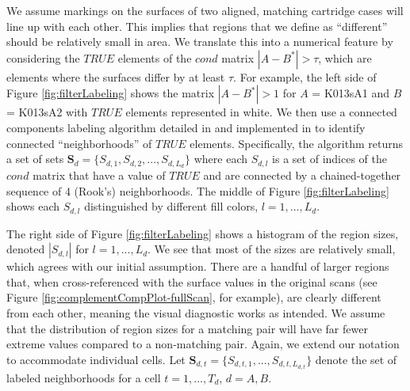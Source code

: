 \documentclass[11pt,]{isuthesis}
\begin{document}
We assume markings on the surfaces of two aligned, matching cartridge cases will line up with each other.
This implies that regions that we define as ``different'' should be relatively small in area.
We translate this into a numerical feature by considering the \(TRUE\) elements of the \(cond\) matrix \(|A - B^*| > \tau\), which are elements where the surfaces differ by at least \(\tau\).
For example, the left side of Figure \ref{fig:filterLabeling} shows the matrix \(|A - B^*| > 1\) for \(A\) = K013sA1 and \(B\) = K013sA2 with \(TRUE\) elements represented in white.
We then use a connected components labeling algorithm detailed in \citet{hesselink_concurrent_2001} and implemented in \citet{imager} to identify connected ``neighborhoods'' of \(TRUE\) elements.
Specifically, the algorithm returns a set of sets \(\pmb{S}_d = \{S_{d,1},S_{d,2},...,S_{d,L_d}\}\) where each \(S_{d,l}\) is a set of indices of the \(cond\) matrix that have a value of \(TRUE\) and are connected by a chained-together sequence of 4 (Rook's) neighborhoods.
The middle of Figure \ref{fig:filterLabeling} shows each \(S_{d,l}\) distinguished by different fill colors, \(l = 1,...,L_d\).

The right side of Figure \ref{fig:filterLabeling} shows a histogram of the region sizes, denoted \(|S_{d,l}|\) for \(l = 1,...,L_d\).
We see that most of the sizes are relatively small, which agrees with our initial assumption.
There are a handful of larger regions that, when cross-referenced with the surface values in the original scans (see Figure \ref{fig:complementCompPlot-fullScan}, for example), are clearly different from each other, meaning the visual diagnostic works as intended.
We assume that the distribution of region sizes for a matching pair will have far fewer extreme values compared to a non-matching pair.
Again, we extend our notation to accommodate individual cells.
Let \(\pmb{S}_{d,t} = \{S_{d,t,1},...,S_{d,t,L_{d,t}}\}\) denote the set of labeled neighborhoods for a cell \(t = 1,...,T_d\), \(d = A,B\).
\end{document}
